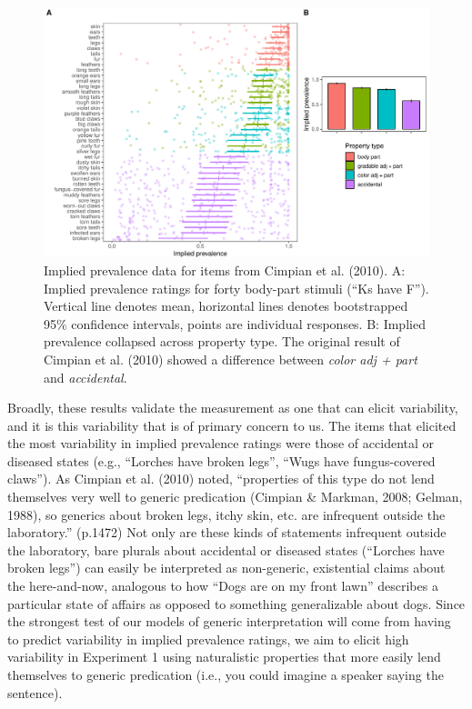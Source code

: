 \documentclass[floatsintext,doc]{apa6}
\begin{document}
\begin{figure}
\centering
\includegraphics{figs/cimpian-results}
\caption{\label{fig:cimpian-modelingResults}Implied prevalence data for items from Cimpian et al. (2010). A: Implied prevalence ratings for forty body-part stimuli (\enquote{Ks have F}). Vertical line denotes mean, horizontal lines denotes bootstrapped 95\% confidence intervals, points are individual responses. B: Implied prevalence collapsed across property type. The original result of Cimpian et al. (2010) showed a difference between \emph{color adj + part} and \emph{accidental}.}
\end{figure}

Broadly, these results validate the measurement as one that can elicit variability, and it is this variability that is of primary concern to us.
The items that elicited the most variability in implied prevalence ratings were those of accidental or diseased states (e.g., \enquote{Lorches have broken legs}, \enquote{Wugs have fungus-covered claws}).
As Cimpian et al. (2010) noted, \enquote{properties of this type do not lend themselves very well to generic predication (Cimpian \& Markman, 2008; Gelman, 1988), so generics about broken legs, itchy skin, etc. are infrequent outside the laboratory.} (p.1472)
Not only are these kinds of statements infrequent outside the laboratory, bare plurals about accidental or diseased states (\enquote{Lorches have broken legs}) can easily be interpreted as non-generic, existential claims about the here-and-now, analogous to how \enquote{Dogs are on my front lawn} describes a particular state of affairs as opposed to something generalizable about dogs.
Since the strongest test of our models of generic interpretation will come from having to predict variability in implied prevalence ratings, we aim to elicit high variability in Experiment 1 using naturalistic properties that more easily lend themselves to generic predication (i.e., you could imagine a speaker saying the sentence).
\end{document}
